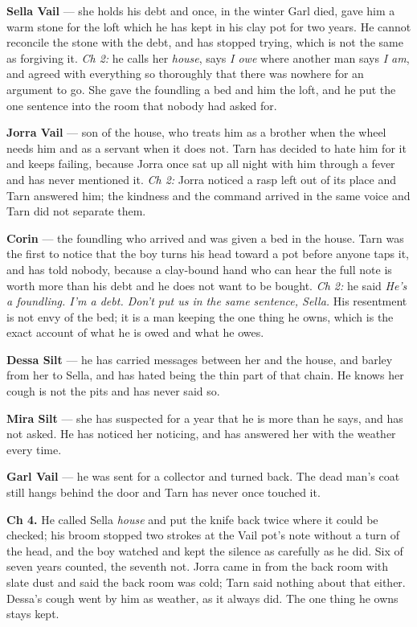 \documentclass{design/chronicle}
\begin{document}
{
\textbf{Sella Vail} — she holds his debt and once, in the winter Garl died, gave him a warm stone for the loft which he has kept in his clay pot for two years. He cannot reconcile the stone with the debt, and has stopped trying, which is not the same as forgiving it. \emph{Ch 2:} he calls her \emph{house}, says \emph{I owe} where another man says \emph{I am}, and agreed with everything so thoroughly that there was nowhere for an argument to go. She gave the foundling a bed and him the loft, and he put the one sentence into the room that nobody had asked for.

\textbf{Jorra Vail} — son of the house, who treats him as a brother when the wheel needs him and as a servant when it does not. Tarn has decided to hate him for it and keeps failing, because Jorra once sat up all night with him through a fever and has never mentioned it. \emph{Ch 2:} Jorra noticed a rasp left out of its place and Tarn answered him; the kindness and the command arrived in the same voice and Tarn did not separate them.

\textbf{Corin} — the foundling who arrived and was given a bed in the house. Tarn was the first to notice that the boy turns his head toward a pot before anyone taps it, and has told nobody, because a clay-bound hand who can hear the full note is worth more than his debt and he does not want to be bought. \emph{Ch 2:} he said \emph{He’s a foundling. I’m a debt. Don’t put us in the same sentence, Sella.} His resentment is not envy of the bed; it is a man keeping the one thing he owns, which is the exact account of what he is owed and what he owes.

\textbf{Dessa Silt} — he has carried messages between her and the house, and barley from her to Sella, and has hated being the thin part of that chain. He knows her cough is not the pits and has never said so.

\textbf{Mira Silt} — she has suspected for a year that he is more than he says, and has not asked. He has noticed her noticing, and has answered her with the weather every time.

\textbf{Garl Vail} — he was sent for a collector and turned back. The dead man’s coat still hangs behind the door and Tarn has never once touched it.

\textbf{Ch 4.} He called Sella \emph{house} and put the knife back twice where it could be checked; his broom stopped two strokes at the Vail pot’s note without a turn of the head, and the boy watched and kept the silence as carefully as he did. Six of seven years counted, the seventh not. Jorra came in from the back room with slate dust and said the back room was cold; Tarn said nothing about that either. Dessa’s cough went by him as weather, as it always did. The one thing he owns stays kept.

}
\end{document}
